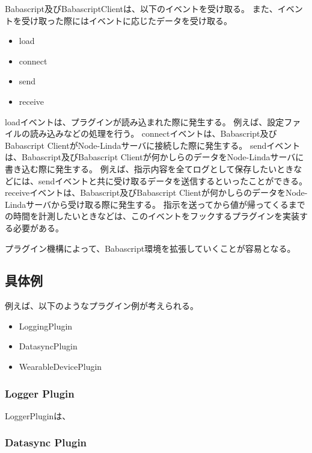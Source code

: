 Babascript及びBabascriptClientは、以下のイベントを受け取る。
また、イベントを受け取った際にはイベントに応じたデータを受け取る。

\begin{itemize}
\itemsep1pt\parskip0pt
\item
  load
\item
  connect
\item
  send
\item
  receive
\end{itemize}

loadイベントは、プラグインが読み込まれた際に発生する。
例えば、設定ファイルの読み込みなどの処理を行う。
connectイベントは、Babascript及びBabascript
ClientがNode-Lindaサーバに接続した際に発生する。
sendイベントは、Babascript及びBabascript
Clientが何かしらのデータをNode-Lindaサーバに書き込む際に発生する。
例えば、指示内容を全てログとして保存したいときなどには、sendイベントと共に受け取るデータを送信するといったことができる。
receiveイベントは、Babascript及びBabascript
Clientが何かしらのデータをNode-Lindaサーバから受け取る際に発生する。
指示を送ってから値が帰ってくるまでの時間を計測したいときなどは、このイベントをフックするプラグインを実装する必要がある。

プラグイン機構によって、Babascript環境を拡張していくことが容易となる。

\subsection{具体例}\label{ux5177ux4f53ux4f8b}

例えば、以下のようなプラグイン例が考えられる。

\begin{itemize}
\itemsep1pt\parskip0pt
\item
  LoggingPlugin
\item
  DatasyncPlugin
\item
  WearableDevicePlugin
\end{itemize}

\subsubsection{Logger Plugin}\label{logger-plugin}

LoggerPluginは、

\subsubsection{Datasync Plugin}\label{datasync-plugin}
